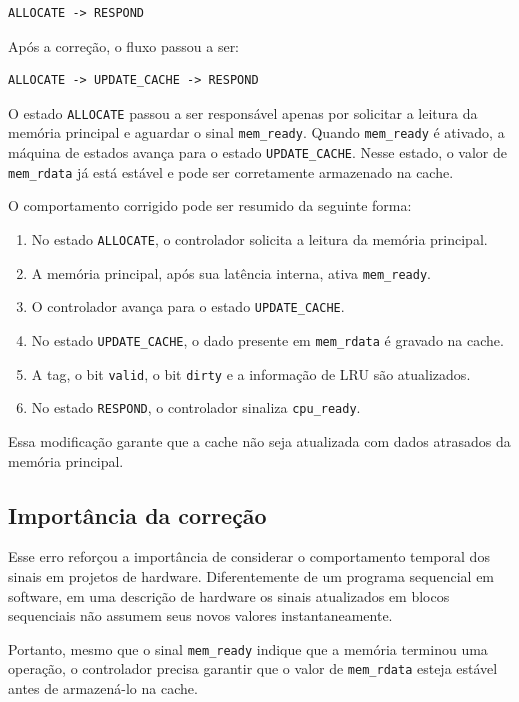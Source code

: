 ﻿\documentclass[12pt,a4paper]{article}
\begin{document}
\begin{verbatim}
ALLOCATE -> RESPOND
\end{verbatim}

Após a correção, o fluxo passou a ser:

\begin{verbatim}
ALLOCATE -> UPDATE_CACHE -> RESPOND
\end{verbatim}

O estado \texttt{ALLOCATE} passou a ser responsável apenas por solicitar a leitura da memória principal e aguardar o sinal \texttt{mem\_ready}. Quando \texttt{mem\_ready} é ativado, a máquina de estados avança para o estado \texttt{UPDATE\_CACHE}. Nesse estado, o valor de \texttt{mem\_rdata} já está estável e pode ser corretamente armazenado na cache.

O comportamento corrigido pode ser resumido da seguinte forma:

\begin{enumerate}
    \item No estado \texttt{ALLOCATE}, o controlador solicita a leitura da memória principal.
    \item A memória principal, após sua latência interna, ativa \texttt{mem\_ready}.
    \item O controlador avança para o estado \texttt{UPDATE\_CACHE}.
    \item No estado \texttt{UPDATE\_CACHE}, o dado presente em \texttt{mem\_rdata} é gravado na cache.
    \item A tag, o bit \texttt{valid}, o bit \texttt{dirty} e a informação de LRU são atualizados.
    \item No estado \texttt{RESPOND}, o controlador sinaliza \texttt{cpu\_ready}.
\end{enumerate}

Essa modificação garante que a cache não seja atualizada com dados atrasados da memória principal.

\subsection{Importância da correção}

Esse erro reforçou a importância de considerar o comportamento temporal dos sinais em projetos de hardware. Diferentemente de um programa sequencial em software, em uma descrição de hardware os sinais atualizados em blocos sequenciais não assumem seus novos valores instantaneamente.

Portanto, mesmo que o sinal \texttt{mem\_ready} indique que a memória terminou uma operação, o controlador precisa garantir que o valor de \texttt{mem\_rdata} esteja estável antes de armazená-lo na cache.
\end{document}
